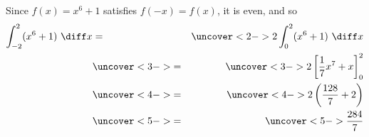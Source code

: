 \begin{frame}
\begin{example}[Example 8, p. 338]
Since $f(x) = x^6 + 1$ satisfies $f(-x) = f(x)$, it is even, and so
\begin{eqnarray*}
\int_{-2}^2 (x^6+1) \ \diff x %
& = &%
\uncover<2->{%
2\int_0^2 (x^6+1) \ \diff x%
}\\%
& \uncover<3->{ = } &%
\uncover<3->{%
2\left[ \frac{1}{7}x^7 + x\right]_0^2%
}\\%
& \uncover<4->{ = } &%
\uncover<4->{%
2\left( \frac{128}{7} + 2\right)%
}\\%
& \uncover<5->{ = } &%
\uncover<5->{%
\frac{284}{7}%
}%
\end{eqnarray*}
\end{example}
\end{frame}
